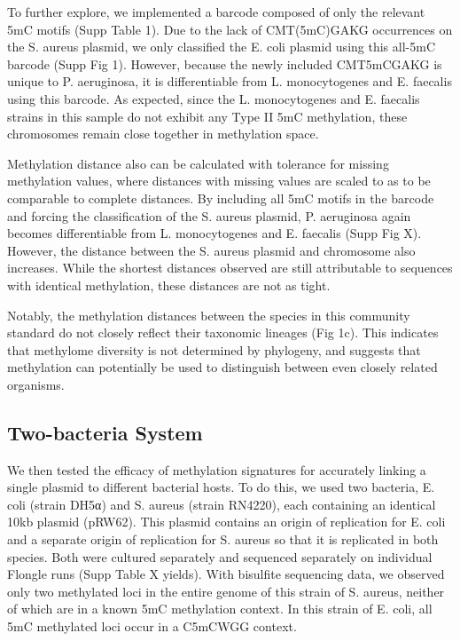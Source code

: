 To further explore, we implemented a barcode composed of only the relevant 5mC motifs (Supp Table 1). Due to the lack of CMT(5mC)GAKG occurrences on the S. aureus plasmid, we only classified the E. coli plasmid using this all-5mC barcode (Supp Fig 1). However, because the newly included CMT5mCGAKG is unique to P. aeruginosa, it is differentiable from L. monocytogenes and E. faecalis using this barcode. As expected, since the L. monocytogenes and E. faecalis strains in this sample do not exhibit any Type II 5mC methylation, these chromosomes remain close together in methylation space.

Methylation distance also can be calculated with tolerance for missing methylation values, where distances with missing values are scaled to as to be comparable to complete distances. By including all 5mC motifs in the barcode and forcing the classification of the S. aureus plasmid, P. aeruginosa again becomes differentiable from L. monocytogenes and E. faecalis (Supp Fig X). However, the distance between the S. aureus plasmid and chromosome also increases. While the shortest distances observed are still attributable to sequences with identical methylation, these distances are not as tight.

Notably, the methylation distances between the species in this community standard do not closely reflect their taxonomic lineages (Fig 1c). This indicates that methylome diversity is not determined by phylogeny, and suggests that methylation can potentially be used to distinguish between even closely related organisms.

\subsection{Two-bacteria System}
\label{sec:byard}

We then tested the efficacy of methylation signatures for accurately linking a single plasmid to different bacterial hosts. To do this, we used two bacteria, E. coli (strain DH5α) and S. aureus (strain RN4220), each containing an identical 10kb plasmid (pRW62). This plasmid contains an origin of replication for E. coli and a separate origin of replication for S. aureus so that it is replicated in both species. Both were cultured separately and sequenced separately on individual Flongle runs (Supp Table X yields). With bisulfite sequencing data, we observed only two methylated loci in the entire genome of this strain of S. aureus, neither of which are in a known 5mC methylation context. In this strain of E. coli, all 5mC methylated loci occur in a C5mCWGG context.

